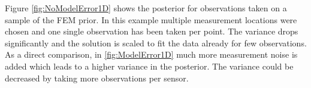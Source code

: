 \documentclass[%
  a4paper,oneside,%
  11pt,%
  smallchapters,
  style=printdev,
  extramargin,
  green,%
  rgb, <cmyk>
  ]{tubsbook}
\begin{document}
%
Figure \ref{fig:NoModelError1D} shows the posterior for observations taken on a sample of the FEM prior. In this example multiple measurement locations were chosen and one single observation has been taken per point. The variance drops significantly and the solution is scaled to fit the data already for few observations.  As a direct comparison, in \ref{fig:ModelError1D} much more measurement noise is added which leads to a higher variance in the posterior. The variance could be decreased by taking more observations per sensor.

\end{document}
